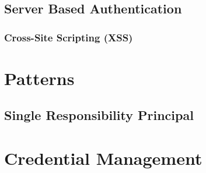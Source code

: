 \subsection{Server Based Authentication}
\subsubsection{Cross-Site Scripting (XSS)}


\section{Patterns}
\subsection{Single Responsibility Principal}


\section{Credential Management}